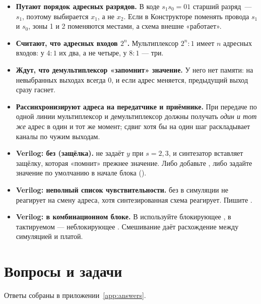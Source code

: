 \begin{warnbox}
\begin{itemize}
  \item \textbf{Путают порядок адресных разрядов.} В коде $s_1s_0=01$ старший разряд~--- $s_1$, поэтому выбирается $x_1$, а не $x_2$. Если в Конструкторе поменять провода $s_1$ и $s_0$, зоны 1 и 2 поменяются местами, а схема внешне «работает».
  \item \textbf{Считают, что адресных входов $2^n$.} Мультиплексор $2^n{:}1$ имеет $n$ адресных входов: у $4{:}1$ их два, а не четыре, у $8{:}1$ --- три.
  \item \textbf{Ждут, что демультиплексор «запомнит» значение.} У него нет памяти: на невыбранных выходах всегда 0, и если адрес меняется, предыдущий выход сразу гаснет.
  \item \textbf{Рассинхронизируют адреса на передатчике и приёмнике.} При передаче по одной линии мультиплексор и демультиплексор должны получать \emph{один и тот же} адрес в один и тот же момент; сдвиг хотя бы на один шаг раскладывает каналы по чужим выходам.
  \item \textbf{Verilog:  без  (защёлка).}
     не задаёт
    $y$ при $s=2,3$, и синтезатор вставляет защёлку, которая «помнит» прежнее
    значение. Либо добавьте , либо задайте значение по умолчанию в
    начале блока ().
  \item \textbf{Verilog: неполный список чувствительности.}
     без  в симуляции не реагирует на смену
    адреса, хотя синтезированная схема реагирует. Пишите .
  \item \textbf{Verilog: \code{<=} в комбинационном блоке.} В
     используйте блокирующее \code{=}, в тактируемом
     --- неблокирующее \code{<=}. Смешивание даёт
    расхождение между симуляцией и платой.
\end{itemize}
\end{warnbox}

\section{Вопросы и задачи}
\label{sec:tasks-mux}

Ответы собраны в приложении~\ref{app:answers}.

